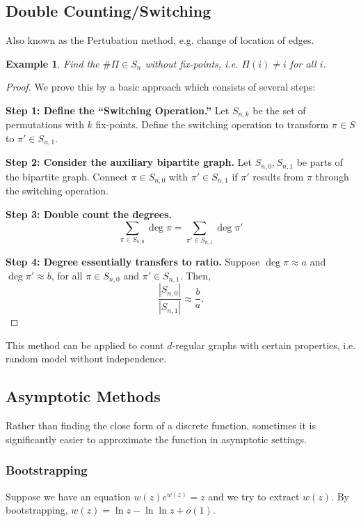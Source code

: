 \documentclass[a4paper]{article}
\newtheorem{example}[theorem]{Example}
\begin{document}
\subsection*{Double Counting/Switching}

Also known as the Pertubation method, e.g. change of location of edges.

\begin{example}
  Find the $\# \Pi \in S_n$ without fix-points, i.e. $\Pi(i) \neq i$ for all $i$.
\end{example}

\begin{proof}
  We prove this by a basic approach which consists of several steps:

  \textbf{Step 1: Define the ``Switching Operation.''} Let $S_{n, k}$ be the set of permutations
  with $k$ fix-points. Define the switching operation to transform $\pi \in S$ to $\pi' \in S_{n,
  1}$.

  \textbf{Step 2: Consider the auxiliary bipartite graph.} Let $S_{n, 0}, S_{n, 1}$ be parts of
  the bipartite graph. Connect $\pi \in S_{n, 0}$ with $\pi' \in S_{n, 1}$ if $\pi'$ results from
  $\pi$ through the switching operation.

  \textbf{Step 3: Double count the degrees.}
  \[
    \sum_{\pi \in S_{n, 0}} \deg \pi = \sum_{\pi' \in S_{n, 1}} \deg \pi'
  \]

  \textbf{Step 4: Degree essentially transfers to ratio.} Suppose $\deg \pi \approx a$ and $\deg
  \pi' \approx b$, for all $\pi \in S_{n, 0}$ and $\pi' \in S_{n, 1}$. Then,
  \[
    \frac{|S_{n, 0}|}{|S_{n, 1}|} \approx \frac{b}{a}.
  \]
\end{proof}

This method can be applied to count $d$-regular graphs with certain properties, i.e. random model
without independence.

\subsection*{Asymptotic Methods}

Rather than finding the close form of a discrete function, sometimes it is significantly easier to
approximate the function in asymptotic settings.

\subsubsection*{Bootstrapping}

Suppose we have an equation $w(z)e^{w(z)} = z$ and we try to extract $w(z)$. By bootstrapping, $w(z)
= \ln z - \ln \ln z + o(1)$.
\end{document}
